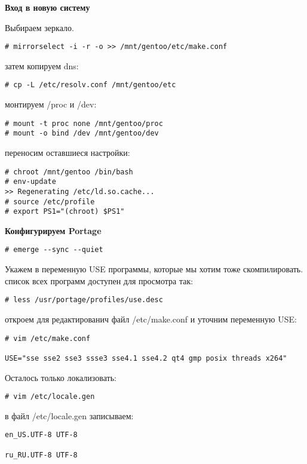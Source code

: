 \documentclass[12pt, a6paper]{article}
\begin{document}
{\bf Вход в новую систему}


Выбираем зеркало.

\begin{verbatim}
# mirrorselect -i -r -o >> /mnt/gentoo/etc/make.conf
\end{verbatim}

затем копируем dns:

\begin{verbatim}
# cp -L /etc/resolv.conf /mnt/gentoo/etc
\end{verbatim}

монтируем /proc и /dev:

\begin{verbatim}
# mount -t proc none /mnt/gentoo/proc
# mount -o bind /dev /mnt/gentoo/dev
\end{verbatim}

переносим оставшиеся настройки:

\begin{verbatim}
# chroot /mnt/gentoo /bin/bash
# env-update
>> Regenerating /etc/ld.so.cache...
# source /etc/profile
# export PS1="(chroot) $PS1"
\end{verbatim}

{\bf Конфигурируем Portage}

\begin{verbatim}
# emerge --sync --quiet
\end{verbatim}

Укажем в переменную USE программы, которые мы хотим тоже скомпилировать. список всех программ доступен для просмотра так:

\begin{verbatim}
# less /usr/portage/profiles/use.desc
\end{verbatim}

откроем для редактированич файл /etc/make.conf и уточним переменную USE:

\begin{verbatim}
# vim /etc/make.conf

USE="sse sse2 sse3 ssse3 sse4.1 sse4.2 qt4 gmp posix threads x264"
\end{verbatim}

Осталось только локализовать:

\begin{verbatim}
# vim /etc/locale.gen
\end{verbatim}

в файл /etc/locale.gen записываем:

\begin{verbatim}
en_US.UTF-8 UTF-8

ru_RU.UTF-8 UTF-8
\end{verbatim}
\end{document}
